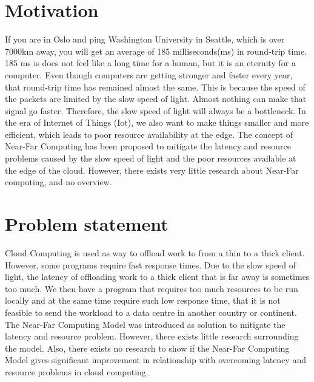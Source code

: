 

\section{Motivation}
If you are in Oslo and ping Washington University in Seattle, which is over 7000km away,  you will get an average of 185 milliseconds(ms) in round-trip time. 185 ms is does not feel like a long time for a human, but it is an eternity for a computer. Even though computers are getting stronger and faster every year, that round-trip time has remained almost the same. This is because the speed of the packets are limited by the slow speed of light. Almost nothing can make that signal go faster. Therefore, the slow speed of light will always be a bottleneck. In the era of Internet of Things (Iot), we also want to make things smaller and more efficient, which leads to poor resource availability at the edge. The concept of Near-Far Computing has been proposed to mitigate the latency and resource problems caused by the slow speed of light and the poor resources available at the edge of the cloud. However, there exists very little research about Near-Far computing, and no overview.



\section{Problem statement}         %
Cloud Computing is used as way to offload work to from a thin to a thick client. However, some programs require fast response times. Due to the slow speed of light, the latency of offloading work to a thick client that is far away is sometimes too much. We then have a program that requires too much resources to be run locally and at the same time require such low response time, that it is not feasible to send the workload to a data centre in another country or continent. The Near-Far Computing Model was introduced as solution to mitigate the latency and resource problem. However, there exists little research surrounding the model. Also, there exists no research to show if the Near-Far Computing Model gives significant improvement in relationship with overcoming latency and resource problems in cloud computing.


